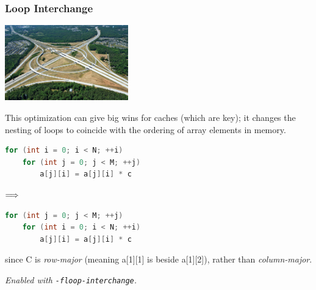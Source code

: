 \begin{frame}[fragile]
\frametitle{Loop Interchange}

\begin{center}
	\includegraphics[width=0.4\textwidth]{images/loop-interchange.jpg}
\end{center}

This optimization can give big wins
for caches (which are key); it changes the nesting of loops to
coincide with the ordering of array elements in memory. 


\begin{center}
\vspace*{-1em}
\begin{minipage}{.4\textwidth}
  \begin{lstlisting}[language=C]
for (int i = 0; i < N; ++i)
    for (int j = 0; j < M; ++j)
        a[j][i] = a[j][i] * c
  \end{lstlisting}
  \end{minipage} $\Longrightarrow \hspace*{2em}$ \begin{minipage}{.4\textwidth}
  \begin{lstlisting}[language=C]
for (int j = 0; j < M; ++j)
    for (int i = 0; i < N; ++i)
        a[j][i] = a[j][i] * c
  \end{lstlisting}
  \end{minipage}
  \end{center}
  since C is \emph{row-major} (meaning a[1][1] is beside a[1][2]),
rather than \emph{column-major}.

\noindent
\emph{Enabled with {\tt -floop-interchange}.}

\end{frame}

